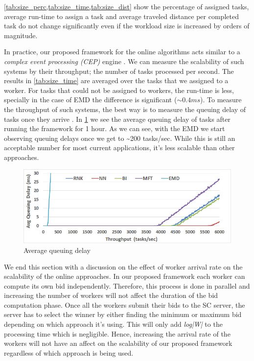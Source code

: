 \cref{tab:size_perc,tab:size_time,tab:size_dist} show the percentage of assigned tasks, average run-time to assign a task and average traveled distance per completed task do not change significantly even if the workload size is increased by orders of magnitude.

In practice, our proposed framework for the online algorithms acts similar to a \emph{complex event processing (CEP)} engine \cite{Luckham01}. We can measure the scalability of such systems by their throughput; the number of tasks processed per second. The results in \cref{tab:size_time} are averaged over the tasks that we assigned to a worker. For tasks that could not be assigned to workers, the run-time is less, specially in the case of EMD the difference is significant ($\sim 0.4 ms$). To measure the throughput of such systems, the best way is to measure the queuing delay of tasks once they arrive \cite{Wu06}. In \cref{fig:qdelay} we see the average queuing delay of tasks after running the framework for 1 hour. As we can see, with the EMD we start observing queuing delays once we get to \textasciitilde 200 tasks/sec. While this is still an acceptable number for most current applications, it's less scalable than other approaches.

\begin{figure}[h]
	\centering
	\includegraphics[width = 0.9\columnwidth]{figures/queue_delay.jpg}
	\vspace{-0.1in}
	\caption{Average queuing delay}\label{fig:qdelay}
\end{figure}

We end this section with a discussion on the effect of worker arrival rate on the scalability of the online approaches. In our proposed framework each worker can compute its own bid independently. Therefore, this process is done in parallel and increasing the number of workers will not affect the duration of the bid computation phase. Once all the workers submit their bids to the SC server, the server has to select the winner by either finding the minimum or maximum bid depending on which approach it's using. This will only add \emph{log|W|} to the processing time which is negligible. Hence, increasing the arrival rate of the workers will not have an affect on the scalability of our proposed framework regardless of which approach is being used.